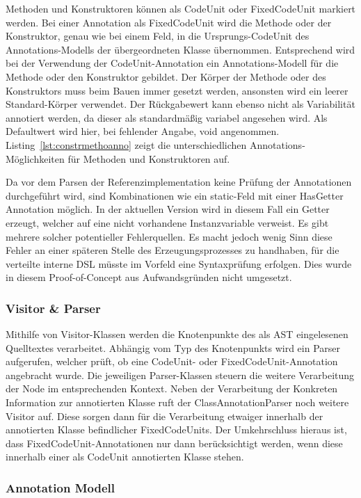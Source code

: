 \documentclass[12pt,oneside,a4paper,parskip]{scrbook}
\begin{document}
Methoden und Konstruktoren können als CodeUnit oder FixedCodeUnit markiert werden. Bei einer Annotation als FixedCodeUnit wird die Methode oder der Konstruktor, genau wie bei einem Feld, in die Ursprungs-CodeUnit des Annotations-Modells der übergeordneten Klasse übernommen. Entsprechend wird bei der Verwendung der CodeUnit-Annotation ein Annotations-Modell für die Methode oder den Konstruktor gebildet. Der Körper der Methode oder des Konstruktors muss beim Bauen immer gesetzt werden, ansonsten wird ein leerer Standard-Körper verwendet. Der Rückgabewert kann ebenso nicht als Variabilität annotiert werden, da dieser als standardmäßig variabel angesehen wird. Als Defaultwert wird hier, bei fehlender Angabe, void angenommen. Listing~\ref{lst:constrmethoanno} zeigt die unterschiedlichen Annotations-Möglichkeiten für Methoden und Konstruktoren auf.

Da vor dem Parsen der Referenzimplementation keine Prüfung der Annotationen durchgeführt wird, sind Kombinationen wie ein static-Feld mit einer HasGetter Annotation möglich. In der aktuellen Version wird in diesem Fall ein Getter erzeugt, welcher auf eine nicht vorhandene Instanzvariable verweist. Es gibt mehrere solcher potentieller Fehlerquellen. Es macht jedoch wenig Sinn diese Fehler an einer späteren Stelle des Erzeugungsprozesses zu handhaben, für die verteilte interne DSL müsste im Vorfeld eine Syntaxprüfung erfolgen. Dies wurde in diesem Proof-of-Concept aus Aufwandsgründen nicht umgesetzt.

\subsubsection{Visitor \& Parser}

Mithilfe von Visitor-Klassen werden die Knotenpunkte des als AST eingelesenen Quelltextes verarbeitet. Abhängig vom Typ des Knotenpunkts wird ein Parser aufgerufen, welcher prüft, ob eine CodeUnit- oder FixedCodeUnit-Annotation angebracht wurde. Die jeweiligen Parser-Klassen steuern die weitere Verarbeitung der Node im entsprechenden Kontext. Neben der Verarbeitung der Konkreten Information zur annotierten Klasse ruft der ClassAnnotationParser noch weitere Visitor auf. Diese sorgen dann für die Verarbeitung etwaiger innerhalb der annotierten Klasse befindlicher FixedCodeUnits. Der Umkehrschluss hieraus ist, dass FixedCodeUnit-Annotationen nur dann berücksichtigt werden, wenn diese innerhalb einer als CodeUnit annotierten Klasse stehen.

\subsubsection{Annotation Modell}
\end{document}
